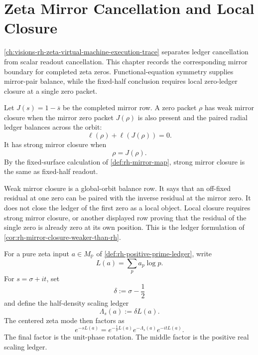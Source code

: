 \chapter{Zeta Mirror Cancellation and Local Closure}
\label{ch:visions-rh-zeta-mirror-cancellation-local-closure}

\autoref{ch:visions-rh-zeta-virtual-machine-execution-trace} separates
ledger cancellation from scalar readout cancellation.  This chapter
records the corresponding mirror boundary for completed zeta zeros.
Functional-equation symmetry supplies mirror-pair balance, while the
fixed-half conclusion requires local zero-ledger closure at a single
zero packet.

\begin{definition}
\label{def:rh-weak-strong-mirror-closure}
Let $J(s)=1-\overline{s}$ be the completed mirror row.  A zero packet
$\rho$ has weak mirror closure when the mirror zero packet $J(\rho)$ is
also present and the paired radial ledger balances across the orbit:
$$
\ell(\rho)+\ell(J(\rho))=0.
$$
It has strong mirror closure when
$$
\rho=J(\rho).
$$
By the fixed-surface calculation of \autoref{def:rh-mirror-map}, strong
mirror closure is the same as fixed-half readout.
\end{definition}

\begin{principle}
\label{prin:rh-global-cancellation-not-local-closure}
Weak mirror closure is a global-orbit balance row.  It says that an
off-fixed residual at one zero can be paired with the inverse residual
at the mirror zero.  It does not close the ledger of the first zero as a
local object.  Local closure requires strong mirror closure, or another
displayed row proving that the residual of the single zero is already
zero at its own position.  This is the ledger formulation of
\autoref{cor:rh-mirror-closure-weaker-than-rh}.
\end{principle}

\begin{definition}
\label{def:rh-half-density-scaling-ledger}
For a pure zeta input $a\in M_{\mathbb P}$ of
\autoref{def:rh-positive-prime-ledger}, write
$$
L(a)=\sum_p a_p\log p.
$$
For $s=\sigma+it$, set
$$
\delta:=\sigma-\frac12
$$
and define the half-density scaling ledger
$$
\Lambda_s(a):=\delta L(a).
$$
The centered zeta mode then factors as
$$
e^{-sL(a)}
=
e^{-\frac12 L(a)}
e^{-\Lambda_s(a)}
e^{-itL(a)}.
$$
The final factor is the unit-phase rotation.  The middle factor is the
positive real scaling ledger.
\end{definition}

